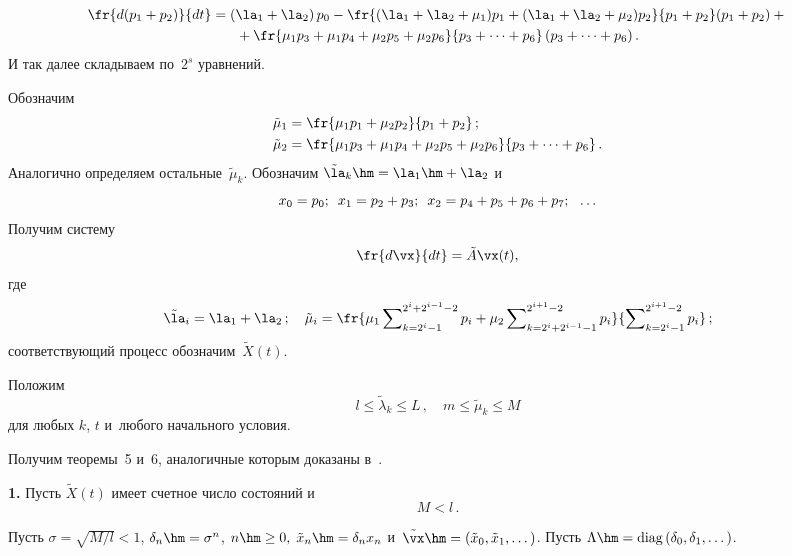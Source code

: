 \vspace*{-12pt}

\noindent
\begin{multline*}
\fr{d(p_1+p_2)}{dt}= \left(\la_1+\la_2\right)p_0-
\fr{(\la_1+\la_2+\mu_1)p_1+(\la_1+\la_2+\mu_2)p_2}{p_1+p_2}(p_1+p_2)+{}\\
{}+
\fr{\mu_1p_3+\mu_1p_4+\mu_2p_5+\mu_2p_6}{p_3+\cdots+p_6}\left(p_3+\cdots+p_6\right).
\end{multline*}
%
И так далее складываем по~$2^s$ уравнений.

Обозначим
\begin{align*}
\tilde{\mu}_1&=\fr{\mu_1p_1+\mu_2p_2}{p_1+p_2}\,;
\\
\tilde{\mu}_2&=\fr{\mu_1p_3+\mu_1p_4+\mu_2p_5+\mu_2p_6}{p_3+\cdots+p_6}\,.
\end{align*}
%
Аналогично определяем остальные~$\tilde{\mu}_k$.
Обозначим $\tilde{\la}_k\hm=\la_1\hm+\la_2$ и~$$
x_0=p_0;\enskip  x_1=p_2+p_3;\enskip x_2=p_4+p_5+p_6+p_7;\ \  \ldots
$$
%
Получим систему %
\begin{equation*}
\fr{d\vx}{dt}=\tilde{A}\vx(t),
\end{equation*}
где
    \begin{equation*}
\tilde{\la}_i=\la_1+\la_2\,; \quad 
\tilde{\mu}_i = \fr{\mu_1\sum\nolimits_{k=2^i-1}^{2^i+2^{i-1}-2}p_i +
\mu_2 \sum\nolimits_{k=2^i+2^{i-1}-1}^{2^{i+1}-2}p_i}{\sum\nolimits_{k=2^i-1}^{2^{i+1}-2}p_i}\,;
\end{equation*}
соответствующий процесс обозначим~$\tilde{X}(t)$.

Положим
\begin{equation*}
l\leq \tilde{\lambda}_k \leq L\,, \quad m\leq \tilde{\mu}_k \leq
M
\end{equation*}
для любых $k$, $t$ и~любого начального условия.

Получим теоремы~5 и~6, аналогичные которым доказаны в~\cite{multid}.


{\bf 1.} Пусть  $\tilde{X}(t)$ имеет счетное число состояний
и
\begin{equation}
M < l\,. 
\label{ddddmu2m08}
\end{equation}

Пусть $\sigma =\sqrt{M/l}<1$,  $\delta_n\hm=\sigma ^n$, $n\hm\geq 0,$
$\tilde{x}_n\hm=\delta_n x_n$ и~$\tilde{\vx}\hm=\left(\tilde{x}_0,\tilde{x}_1,\dots\right)$. Пусть
$\Lambda \hm= \mathrm{diag}\left(\delta_0, \delta_1, \dots \right)$.

\smallskip

